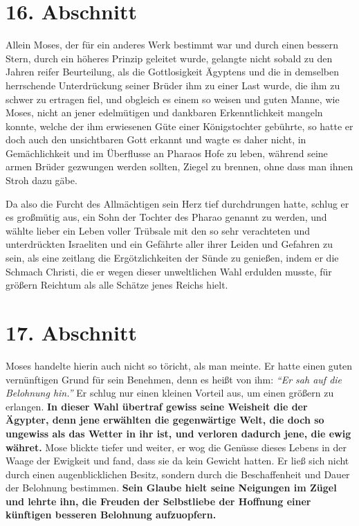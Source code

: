 \section{16. Abschnitt} \label{kap4_ab16}

Allein Moses, der für ein anderes Werk bestimmt war und durch einen bessern
Stern, durch ein höheres Prinzip geleitet wurde, gelangte nicht sobald zu den
Jahren reifer Beurteilung, als die Gottlosigkeit Ägyptens und die in demselben
herrschende Unterdrückung seiner Brüder ihm zu einer Last wurde, die ihm zu
schwer zu ertragen fiel, und obgleich es einem so weisen und guten Manne, wie
Moses, nicht an jener edelmütigen und dankbaren Erkenntlichkeit mangeln
konnte, welche der ihm erwiesenen Güte einer Königstochter gebührte, so hatte er
doch auch den unsichtbaren Gott erkannt und wagte es daher nicht, in
Gemächlichkeit und im Überflusse an Pharaos Hofe zu leben, während seine armen
Brüder gezwungen werden sollten, Ziegel zu brennen, ohne dass man ihnen Stroh
dazu gäbe.

\medskip

Da also die Furcht des Allmächtigen sein Herz tief durchdrungen hatte, schlug er
es großmütig aus, ein Sohn der Tochter des Pharao genannt zu werden, und wählte
lieber ein Leben voller Trübsale mit den so sehr verachteten und unterdrückten
Israeliten und ein Gefährte aller ihrer Leiden und Gefahren zu sein, als eine
zeitlang die Ergötzlichkeiten der Sünde zu genießen, indem er die Schmach
Christi, die er wegen dieser unweltlichen Wahl erdulden musste, für größern
Reichtum als alle Schätze jenes Reichs hielt.

\section{17. Abschnitt} \label{kap4_ab17}

\label{ref:04_17_mose}
Moses handelte hierin auch nicht so töricht, als man meinte. Er hatte einen
guten vernünftigen Grund für sein Benehmen, denn es heißt von ihm:
\textit{"`Er sah auf die Belohnung hin."'}
Er schlug nur einen kleinen
Vorteil aus, um einen größern zu erlangen. \textbf{In dieser Wahl übertraf
gewiss seine
Weisheit die der Ägypter, denn jene erwählten die gegenwärtige Welt, die doch so
ungewiss als das Wetter in ihr ist, und verloren dadurch jene, die ewig währet.}
Mose blickte tiefer und weiter, er wog die Genüsse dieses Lebens in der Waage der
Ewigkeit und fand, dass sie da kein Gewicht hatten. Er
ließ sich nicht durch
einen augenblicklichen Besitz, sondern durch die Beschaffenheit und Dauer der
Belohnung bestimmen. \textbf{Sein Glaube hielt seine Neigungen im Zügel und
lehrte ihn,
die Freuden der Selbstliebe der Hoffnung einer künftigen besseren Belohnung
aufzuopfern.}

